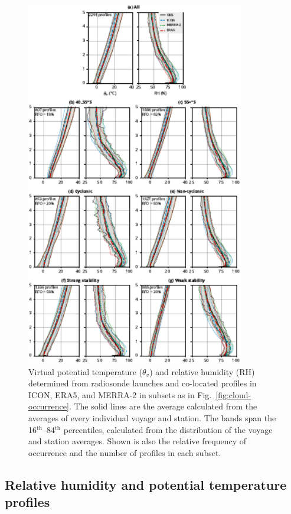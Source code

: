 \documentclass[draft]{agujournal2019}
\begin{document}
\begin{figure}[p!]
\centering
\includegraphics[width=0.85\textwidth]{img/rs_agg_rev1.pdf}
\caption{
Virtual potential temperature ($\theta_v$) and relative humidity (RH) determined from radiosonde launches and co-located profiles in ICON, ERA5, and MERRA-2 in subsets as in Fig.~\ref{fig:cloud-occurrence}. The solid lines are the average calculated from the averages of every individual voyage and station. The bands span the 16$^\mathrm{th}$--84$^\mathrm{th}$ percentiles, calculated from the distribution of the voyage and station averages. Shown is also the relative frequency of occurrence and the number of profiles in each subset.
}
\label{fig:potential-temperature}
\end{figure}

\subsection{Relative humidity and potential temperature profiles}
\label{sec:thermodynamic-profiles}
\end{document}
